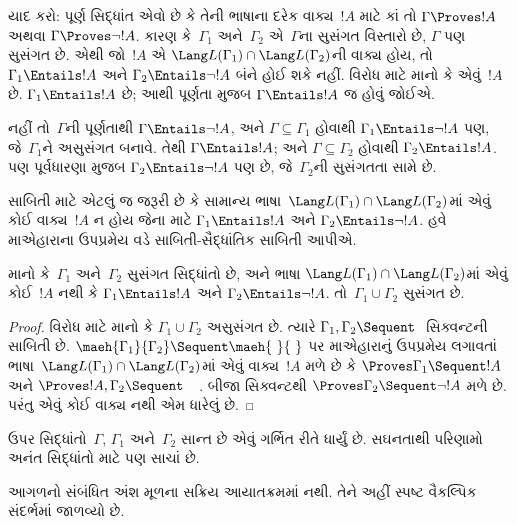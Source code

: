 યાદ કરો: પૂર્ણ સિદ્ધાંત એવો છે કે તેની
ભાષાના દરેક વાક્ય~$!A$ માટે
કાં તો $\Gamma \Proves !A$ અથવા
$\Gamma \Proves \lnot !A$.
કારણ કે~$\Gamma_1$ અને~$\Gamma_2$
એ~$\Gamma$ના સુસંગત વિસ્તારો છે,
$\Gamma$ પણ સુસંગત છે.
એથી જો~$!A$ એ
$\Lang L(\Gamma_1) \cap
\Lang L(\Gamma_2)$ની
વાક્ય હોય, તો
$\Gamma_1 \Entails !A$ અને
$\Gamma_2 \Entails \lnot !A$
બંને હોઈ શકે નહીં.
વિરોધ માટે માનો કે એવું~$!A$ છે.
$\Gamma_1 \Entails !A$ છે;
આથી પૂર્ણતા મુજબ
$\Gamma \Entails !A$ જ હોવું જોઈએ.

નહીં તો~$\Gamma$ની પૂર્ણતાથી
$\Gamma \Entails \lnot !A$,
અને $\Gamma \subseteq \Gamma_1$
હોવાથી
$\Gamma_1 \Entails \lnot !A$ પણ,
જે~$\Gamma_1$ને અસુસંગત બનાવે.
તેથી $\Gamma \Entails !A$;
અને $\Gamma \subseteq \Gamma_2$
હોવાથી
$\Gamma_2 \Entails !A$.
પણ પૂર્વધારણા મુજબ
$\Gamma_2 \Entails \lnot !A$ પણ છે,
જે~$\Gamma_2$ની સુસંગતતા સામે છે.


સાબિતી માટે એટલું જ જરૂરી છે કે
સામાન્ય
ભાષા~$\Lang L(\Gamma_1)
\cap \Lang L(\Gamma_2)$માં
એવું કોઈ વાક્ય~$!A$ ન હોય
જેના માટે
$\Gamma_1 \Entails !A$ અને
$\Gamma_2 \Entails \lnot !A$.
હવે માએહારાના ઉપપ્રમેય વડે
સાબિતી-સૈદ્ધાંતિક સાબિતી આપીએ.

\begin{thm}
માનો કે~$\Gamma_1$ અને~$\Gamma_2$
સુસંગત સિદ્ધાંતો છે, અને
ભાષા
$\Lang L(\Gamma_1) \cap
\Lang L(\Gamma_2)$માં એવું
કોઈ~$!A$ નથી કે
$\Gamma_1 \Entails !A$ અને
$\Gamma_2 \Entails \lnot !A$.
તો~$\Gamma_1 \cup \Gamma_2$
સુસંગત છે.
\end{thm}

\begin{proof}
  વિરોધ માટે માનો કે
  $\Gamma_1 \cup \Gamma_2$
  અસુસંગત છે. ત્યારે
  $\Gamma_1, \Gamma_2 \Sequent \ $
  સિક્વન્ટની સાબિતી છે.
  $\maeh{\Gamma_1}{\Gamma_2}
  \Sequent \maeh{\ }{\ }$
  પર માએહારાનું ઉપપ્રમેય
  લગાવતાં
  ભાષા~$\Lang L(\Gamma_1)
  \cap \Lang L(\Gamma_2)$માં
  એવું વાક્ય~$!A$ મળે છે કે
  $\Proves \Gamma_1 \Sequent !A$
  અને
  $\Proves !A, \Gamma_2 \Sequent \quad$.
  બીજા સિક્વન્ટથી
  $\Proves \Gamma_2 \Sequent \lnot !A$
  મળે છે. પરંતુ એવું કોઈ
  વાક્ય નથી એમ ધારેલું છે.
\end{proof}

ઉપર સિદ્ધાંતો~$\Gamma$,
$\Gamma_1$ અને~$\Gamma_2$
સાન્ત છે એવું ગર્ભિત રીતે
ધાર્યું છે. સઘનતાથી પરિણામો
અનંત સિદ્ધાંતો માટે પણ સાચાં છે.
\endgroup


\OLEndChapterHook


\begin{editorial}
આગળનો સંબંધિત અંશ મૂળના સક્રિય આયાતક્રમમાં નથી. તેને અહીં સ્પષ્ટ વૈકલ્પિક સંદર્ભમાં જાળવ્યો છે.
\end{editorial}
\begingroup
\makeatletter{}\makeatother

